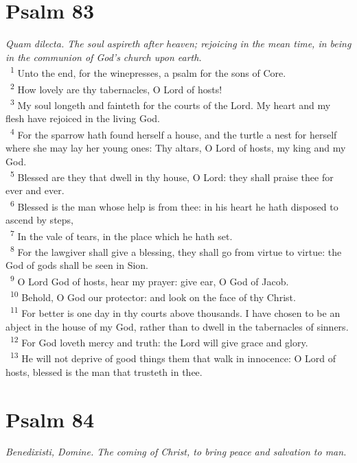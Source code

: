 \documentclass[a5paper,12pt]{article}
\begin{document}
\begin{multicols*}{2}
\section{Psalm 83}
\label{sec:org74b6916}
\emph{Quam dilecta. The soul aspireth after heaven; rejoicing in the mean time, in being in the communion of God's church upon earth.}\\

~\textsuperscript{1} Unto the end, for the winepresses, a psalm for the sons of Core.\\
~\textsuperscript{2} How lovely are thy tabernacles, O Lord of hosts!\\
~\textsuperscript{3} My soul longeth and fainteth for the courts of the Lord. My heart and my flesh have rejoiced in the living God.\\
~\textsuperscript{4} For the sparrow hath found herself a house, and the turtle a nest for herself where she may lay her young ones: Thy altars, O Lord of hosts, my king and my God.\\
~\textsuperscript{5} Blessed are they that dwell in thy house, O Lord: they shall praise thee for ever and ever.\\
~\textsuperscript{6} Blessed is the man whose help is from thee: in his heart he hath disposed to ascend by steps,\\
~\textsuperscript{7} In the vale of tears, in the place which he hath set.\\
~\textsuperscript{8} For the lawgiver shall give a blessing, they shall go from virtue to virtue: the God of gods shall be seen in Sion.\\
~\textsuperscript{9} O Lord God of hosts, hear my prayer: give ear, O God of Jacob.\\
~\textsuperscript{10} Behold, O God our protector: and look on the face of thy Christ.\\
~\textsuperscript{11} For better is one day in thy courts above thousands. I have chosen to be an abject in the house of my God, rather than to dwell in the tabernacles of sinners.\\
~\textsuperscript{12} For God loveth mercy and truth: the Lord will give grace and glory.\\
~\textsuperscript{13} He will not deprive of good things them that walk in innocence: O Lord of hosts, blessed is the man that trusteth in thee.\\

\section{Psalm 84}
\label{sec:orgc46a812}
\emph{Benedixisti, Domine. The coming of Christ, to bring peace and salvation to man.}\\


\end{multicols*}
\end{document}
